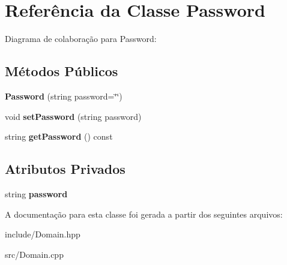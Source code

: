 \hypertarget{classPassword}{}\section{Referência da Classe Password}
\label{classPassword}


Diagrama de colaboração para Password\+:
\subsection*{Métodos Públicos}
\begin{DoxyCompactItemize}
\item 
{\bfseries Password} (string password=\char`\"{}\char`\"{})\hypertarget{classPassword_af45f942f1fc4648e0e6ae9c133116159}{}\label{classPassword_af45f942f1fc4648e0e6ae9c133116159}

\item 
void {\bfseries set\+Password} (string password)\hypertarget{classPassword_a1e4ef90d6b6609d0c416ee32369eb31a}{}\label{classPassword_a1e4ef90d6b6609d0c416ee32369eb31a}

\item 
string {\bfseries get\+Password} () const \hypertarget{classPassword_aa1ab24038569d57185a45e9f85737739}{}\label{classPassword_aa1ab24038569d57185a45e9f85737739}

\end{DoxyCompactItemize}
\subsection*{Atributos Privados}
\begin{DoxyCompactItemize}
\item 
string {\bfseries password}\hypertarget{classPassword_ac9fc114f63a9435c29530413b303564e}{}\label{classPassword_ac9fc114f63a9435c29530413b303564e}

\end{DoxyCompactItemize}


A documentação para esta classe foi gerada a partir dos seguintes arquivos\+:\begin{DoxyCompactItemize}
\item 
include/Domain.\+hpp\item 
src/Domain.\+cpp\end{DoxyCompactItemize}
